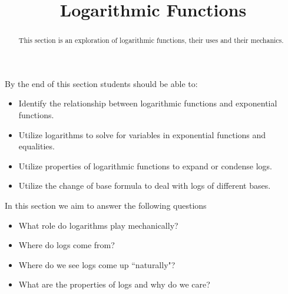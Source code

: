 \documentclass{ximera}
\title{Logarithmic Functions}
\begin{document}
\begin{abstract}
    This section is an exploration of logarithmic functions, their uses and their mechanics.
\end{abstract}
\maketitle
By the end of this section students should be able to:

\begin{itemize}
    \item Identify the relationship between logarithmic functions and exponential functions.
    \item Utilize logarithms to solve for variables in exponential functions and equalities.
    \item Utilize properties of logarithmic functions to expand or condense logs.
    \item Utilize the change of base formula to deal with logs of different bases.
\end{itemize}

In this section we aim to answer the following questions

\begin{itemize}
    \item What role do logarithms play mechanically?
    \item Where do logs come from?
    \item Where do we see logs come up ``naturally"?
    \item What are the properties of logs and why do we care?
\end{itemize}
\end{document}
